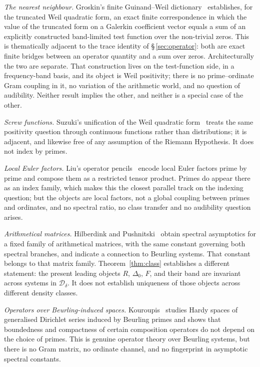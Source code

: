 \documentclass[11pt]{article}
\newcommand{\Dclass}{\mathcal{D}_\delta}        %
\begin{document}
\emph{The nearest neighbour.} Groskin's finite Guinand--Weil
dictionary~\cite{Groskin26b} establishes, for the truncated Weil quadratic
form, an exact finite correspondence in which the value of the truncated form
on a Galerkin coefficient vector equals a sum of an explicitly constructed
band-limited test function over the non-trivial zeros. This is thematically
adjacent to the trace identity of \S\,\ref{sec:operator}: both are exact
finite bridges between an operator quantity and a sum over zeros.
Architecturally the two are separate. That construction lives on the
test-function side, in a frequency-band basis, and its object is Weil
positivity; there is no prime--ordinate Gram coupling in it, no variation of
the arithmetic world, and no question of audibility. Neither result implies
the other, and neither is a special case of the other.

\emph{Screw functions.} Suzuki's unification of the Weil quadratic
form~\cite{Suzuki26} treats the same positivity question through continuous
functions rather than distributions; it is adjacent, and likewise free of any
assumption of the Riemann Hypothesis. It does not index by primes.

\emph{Local Euler factors.} Liu's operator pencils~\cite{Liu26} encode local
Euler factors prime by prime and compose them as a restricted tensor product.
Primes do appear there as an index family, which makes this the closest
parallel track on the indexing question; but the objects are local factors,
not a global coupling between primes and ordinates, and no spectral ratio,
no class transfer and no audibility question arises.

\emph{Arithmetical matrices.} Hilberdink and Pushnitski~\cite{HilberdinkPushnitski24}
obtain spectral asymptotics for a fixed family of arithmetical matrices, with
the same constant governing both spectral branches, and indicate a connection
to Beurling systems. That constant belongs to that matrix family. Theorem~\ref{thm:class}
establishes a different statement: the present leading objects $R$,
$\Delta_0$, $F$, and their band are invariant across systems in
$\Dclass$. It does not establish uniqueness of those objects across
different density classes.

\emph{Operators over Beurling-induced spaces.}
Kouroupis~\cite{Kouroupis23} studies Hardy spaces of generalised Dirichlet
series induced by Beurling primes and shows that boundedness and compactness
of certain composition operators do not depend on the choice of primes. This is genuine operator
theory over Beurling systems, but there is no Gram matrix, no ordinate
channel, and no fingerprint in asymptotic spectral constants.
\end{document}
